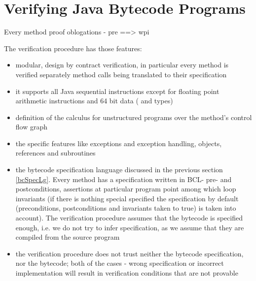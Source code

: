 \section{Verifying Java Bytecode Programs}\label{vcg}
Every method proof oblogations - pre ==> wpi 

The verification procedure has those features:
\begin{itemize}
\item modular, design by contract verification, in particular every method is verified separately method calls being translated to their specification 
\item it supports all Java sequential instructions except for floating point arithmetic instructions and 64 bit data ( and  types)
\item definition of the calculus for unstructured programs over the method's control flow graph
\item the specific features like exceptions and exception handling, objects, references and subroutines
\item the bytecode specification language discussed in the previous section \ref{bcSpecLg}. Every method has a specification written 
in BCL- pre- and postconditions, assertions at particular program point among 
which loop invariants (if there is nothing special specified the specification by default (preconditions, postconditions and invariants taken to true) is taken into account). The verification procedure assumes that the bytecode is specified enough, i.e. we do not try to infer specification, as we assume that they are compiled from the source program
\item the verification procedure does not trust neither the bytecode specification, nor the bytecode; both of the cases - wrong 
specification or incorrect implementation will result in verification conditions that are not provable 
\end{itemize}
